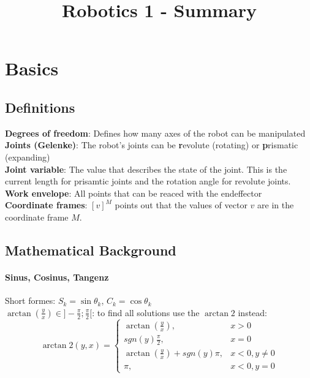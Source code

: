 \documentclass{article}
\begin{document}
	\title{Robotics 1 - Summary}
	\maketitle
	
	\newpage
	
	\tableofcontents
	
	\newpage
	
	\section{Basics}
	\subsection{Definitions}
	\textbf{Degrees of freedom}: Defines how many axes of the robot can be manipulated\\
	\textbf{Joints (Gelenke)}: The robot's joints can be \textbf{r}evolute (rotating) or \textbf{p}rismatic (expanding)\\
	\textbf{Joint variable}: The value that describes the state of the joint. This is the current length for prisamtic joints and the rotation angle for revolute joints.\\
	\textbf{Work envelope}: All points that can be reaced with the endeffector\\
	\textbf{Coordinate frames}: $[v]^M$ points out that the values of vector $v$ are in the coordinate frame $M$.
	
	\subsection{Mathematical Background}
	\paragraph{Sinus, Cosinus, Tangenz}
	Short formes: $S_{k} = \sin \theta_{k}$, $C_{k} = \cos \theta_{k}$\\
	$\arctan(\frac{y}{x}) \in ]-\frac{\pi}{2};\frac{\pi}{2}[$: to find all solutions use the $\arctan2$ instead:
	\begin{equation}
	\arctan2(y,x) = 
	\left\{ \begin{array}{ll}
	\arctan(\frac{y}{x}), & x > 0\\
	sgn(y)\frac{\pi}{2}, & x = 0\\
	\arctan(\frac{y}{x}) + sgn(y)\pi, & x < 0, y \neq 0\\
	\pi, & x < 0, y = 0
	\end{array} \right.
	\end{equation}
	
\end{document}
